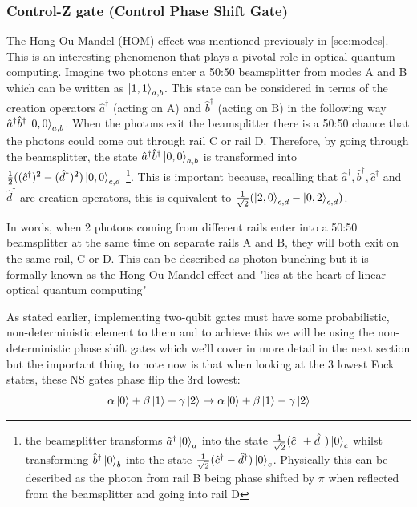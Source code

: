 \subsubsection{Control-Z gate (Control Phase Shift Gate)}
The Hong-Ou-Mandel (HOM) \cite{PhysRevLett.59.2044} effect was mentioned previously in \cref{sec:modes}. This is an interesting phenomenon that plays a pivotal role in optical quantum computing. Imagine two photons enter a 50:50 beamsplitter from modes A and B which can be written as $\ket{1,1}_{a,b}$. This state can be considered in terms of the creation operators $\hat{a}^\dagger$ (acting on A) and $\hat{b}^\dagger$ (acting on B) in the following way $\hat{a}^\dagger\hat{b}^\dagger\ket{0,0}_{a,b}$. When the photons exit the beamsplitter there is a 50:50 chance that the photons could come out through rail C or rail D. Therefore, by going through the beamsplitter, the state $\hat{a}^\dagger\hat{b}^\dagger\ket{0,0}_{a,b}$ is transformed into $\frac{1}{2}((\hat{c}^\dagger)^2 - (\hat{d}^\dagger)^2)\ket{0,0}_{c,d}$ \footnote{ the beamsplitter transforms $\hat{a}^\dagger\ket{0}_a$ into the state $\frac{1}{\sqrt{2}}(\hat{c}^\dagger + \hat{d}^\dagger)\ket{0}_c$ whilst transforming  $\hat{b}^\dagger\ket{0}_b$ into the state $\frac{1}{\sqrt{2}}(\hat{c}^\dagger - \hat{d}^\dagger)\ket{0}_c$. Physically this can be described as the photon from rail B being phase shifted by $\pi$ when reflected from the beamsplitter and going into rail D}. This is important because, recalling that $\hat{a}^\dagger, \hat{b}^\dagger, \hat{c}^\dagger$ and $\hat{d}^\dagger$ are creation operators, this is equivalent to $\frac{1}{\sqrt{2}}(\ket{2,0}_{c,d} - \ket{0,2}_{c,d})$.

In words, when 2 photons coming from different rails enter into a 50:50 beamsplitter at the same time on separate rails A and B, they will both exit on the same rail, C or D. This can be described as photon bunching but it is formally known as the Hong-Ou-Mandel effect and "lies at the heart of linear optical quantum computing" \cite{Kok:2005jip}

As stated earlier, implementing two-qubit gates must have some probabilistic, non-deterministic element to them and to achieve this we will be using the non-deterministic phase shift gates which we'll cover in more detail in the next section but the important thing to note now is that when looking at the 3 lowest Fock states, these NS gates phase flip the 3rd lowest:
\begin{equation} \label{NS evolution}
    \alpha\ket{0} + \beta\ket{1} + \gamma\ket{2} \rightarrow \alpha\ket{0} + \beta\ket{1} - \gamma\ket{2}
\end{equation} \cite{Kok:2005jip}

